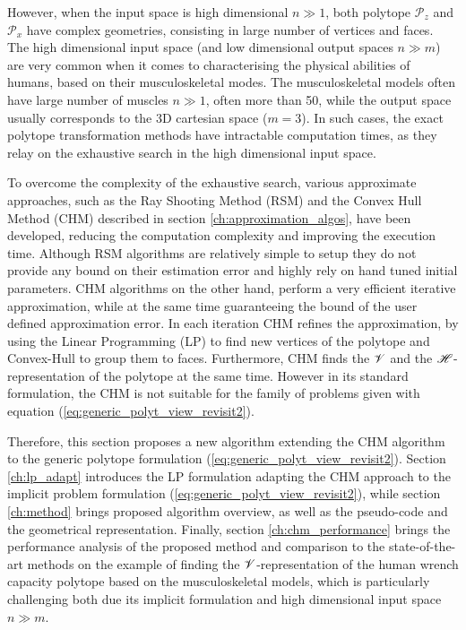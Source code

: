 However, when the input space is high dimensional $n\gg1$, both polytope $\mathcal{P}_z$ and $\mathcal{P}_x$ have complex geometries, consisting in large number of vertices and faces. The high dimensional input space (and low dimensional output spaces $n\gg m$) are very common when it comes to characterising the physical abilities of humans, based on their musculoskeletal modes. The musculoskeletal models often have large number of muscles $n\gg1$, often more than 50, while the output space usually corresponds to the 3D cartesian space ($m=3$). In such cases, the exact polytope transformation methods have intractable computation times, as they relay on the exhaustive search in the high dimensional input space.

To overcome the complexity of the exhaustive search, various approximate approaches, such as the Ray Shooting Method (RSM)  \cite{agarwal1993ray} and the Convex Hull Method (CHM) \cite{lassez1992quantifier} described in section \ref{ch:approximation_algos}, have been developed, reducing the computation complexity and improving the execution time. 
Although RSM algorithms are relatively simple to setup they do not provide any bound on their estimation error and highly rely on hand tuned initial parameters. 
CHM \cite{lassez1992quantifier} algorithms on the other hand, perform a very efficient iterative approximation,  while at the same time guaranteeing the bound of the user defined approximation error. In each iteration CHM refines the approximation, by using the Linear Programming (LP) to find new vertices of the polytope and Convex-Hull to group them to faces. Furthermore, CHM finds the $\mathscr{V}$ and the $\mathscr{H}$-representation of the polytope at the same time. However in its standard formulation, the CHM is not suitable for the family of problems given with equation (\ref{eq:generic_polyt_view_revisit2}). 

Therefore, this section proposes a new algorithm extending the CHM algorithm to the generic polytope formulation (\ref{eq:generic_polyt_view_revisit2}). Section \ref{ch:lp_adapt} introduces the LP formulation adapting the CHM approach to the implicit problem formulation (\ref{eq:generic_polyt_view_revisit2}), while section \ref{ch:method} brings proposed algorithm overview, as well as the pseudo-code and the geometrical representation. Finally, section \ref{ch:chm_performance} brings the performance analysis of the proposed method and comparison to the state-of-the-art methods on the example of finding the $\mathscr{V}$-representation of the human wrench capacity polytope based on the musculoskeletal models, which is particularly challenging both due its implicit formulation and high dimensional input space $n\gg m$.

